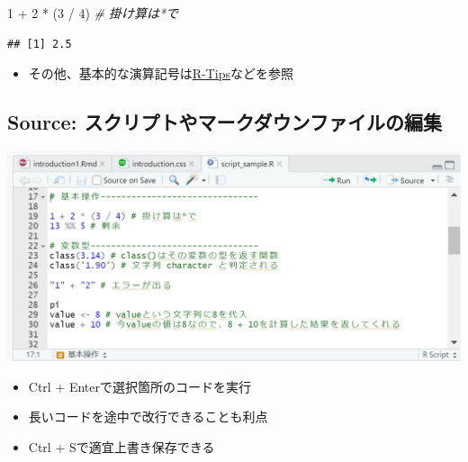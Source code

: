 \documentclass[
]{ltjsarticle}
\newenvironment{Shaded}{\begin{snugshade}}{\end{snugshade}}
\newcommand{\CommentTok}[1]{\textcolor[rgb]{0.56,0.35,0.01}{\textit{#1}}}
\newcommand{\DecValTok}[1]{\textcolor[rgb]{0.00,0.00,0.81}{#1}}
\newcommand{\NormalTok}[1]{#1}
\newcommand{\SpecialCharTok}[1]{\textcolor[rgb]{0.00,0.00,0.00}{#1}}
\providecommand{\tightlist}{%
  \setlength{\itemsep}{0pt}\setlength{\parskip}{0pt}}
\begin{document}
\begin{Shaded}
\begin{Highlighting}[]
\DecValTok{1} \SpecialCharTok{+} \DecValTok{2} \SpecialCharTok{*}\NormalTok{ (}\DecValTok{3} \SpecialCharTok{/} \DecValTok{4}\NormalTok{) }\CommentTok{\# 掛け算は*で}
\end{Highlighting}
\end{Shaded}

\begin{verbatim}
## [1] 2.5
\end{verbatim}

\begin{itemize}
\tightlist
\item
  その他、基本的な演算記号は\href{http://cse.naro.affrc.go.jp/takezawa/r-tips/r.html}{R-Tips}などを参照
\end{itemize}

\hypertarget{source-ux30b9ux30afux30eaux30d7ux30c8ux3084ux30deux30fcux30afux30c0ux30a6ux30f3ux30d5ux30a1ux30a4ux30ebux306eux7de8ux96c6}{%
\subsection{Source:
スクリプトやマークダウンファイルの編集}\label{source-ux30b9ux30afux30eaux30d7ux30c8ux3084ux30deux30fcux30afux30c0ux30a6ux30f3ux30d5ux30a1ux30a4ux30ebux306eux7de8ux96c6}}

\begin{center}\includegraphics[width=0.95\linewidth]{figs/script} \end{center}

\begin{itemize}
\tightlist
\item
  Ctrl + Enterで選択箇所のコードを実行
\item
  長いコードを途中で改行できることも利点
\item
  Ctrl + Sで適宜上書き保存できる
\end{itemize}
\end{document}
